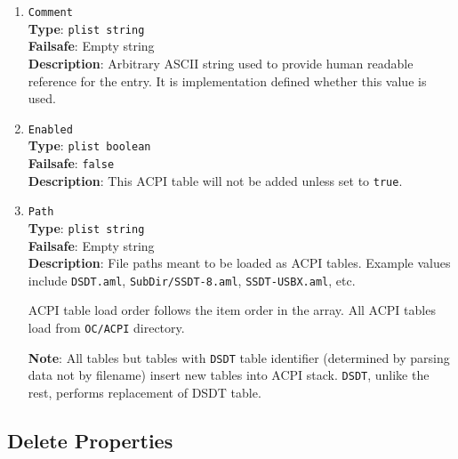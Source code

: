 \documentclass[]{article}
\makeatletter
\renewcommand{\label}[1]{%
\zref@wrapper@immediate{\oldlabel{#1}}}  %
\makeatother
\begin{document}
\begin{enumerate}
\item
  \texttt{Comment}\\
  \textbf{Type}: \texttt{plist\ string}\\
  \textbf{Failsafe}: Empty string\\
  \textbf{Description}: Arbitrary ASCII string used to provide human readable
  reference for the entry. It is implementation defined whether this value is
  used.

\item
  \texttt{Enabled}\\
  \textbf{Type}: \texttt{plist\ boolean}\\
  \textbf{Failsafe}: \texttt{false}\\
  \textbf{Description}: This ACPI table will not be added unless set to
  \texttt{true}.

\item
  \texttt{Path}\\
  \textbf{Type}: \texttt{plist\ string}\\
  \textbf{Failsafe}: Empty string\\
  \textbf{Description}: File paths meant to be loaded as ACPI tables.
  Example values include \texttt{DSDT.aml}, \texttt{SubDir/SSDT-8.aml},
  \texttt{SSDT-USBX.aml}, etc.

  ACPI table load order follows the item order in the array. All ACPI tables
  load from \texttt{OC/ACPI} directory.

  \textbf{Note}: All tables but tables with \texttt{DSDT} table identifier
  (determined by parsing data not by filename) insert new tables into ACPI stack.
  \texttt{DSDT}, unlike the rest, performs replacement of DSDT table.

\end{enumerate}

\subsection{Delete Properties}\label{acpipropsdelete}
\end{document}
